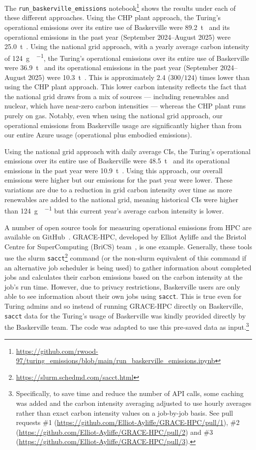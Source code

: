 \documentclass[12pt]{article}
\newcommand{\cooe}{\ensuremath{\mathrm{CO}_2\mathrm{e}}}
\newcommand{\tcooe}[1]{\qty[qualifier-mode=combine]{#1}{\tonne\of{\cooe}}}
\newcommand{\gcookwh}[1]{\qty[qualifier-mode=combine, per-mode=symbol]{#1}{\gram\of{\cooe}\per\KWH}}
\begin{document}
The \texttt{run\_baskerville\_emissions} notebook\footnote{\url{https://github.com/rwood-97/turing_emissions/blob/main/run_baskerville_emissions.ipynb}} shows the results under each of these different approaches.
Using the CHP plant approach, the Turing's operational emissions over its entire use of Baskerville were \qty[qualifier-mode=combine]{89.2}{\tonne\of{\cooe}} and its operational emissions in the past year (September 2024--August 2025) were \tcooe{25.0}. 
Using the national grid approach, with a yearly average carbon intensity of \gcookwh{124}, the Turing's operational emissions over its entire use of Baskerville were \tcooe{36.9} and its operational emissions in the past year (September 2024--August 2025) were \tcooe{10.3}. This is approximately \num{2.4} ($300/124$) times lower than using the CHP plant approach. This lower carbon intensity reflects the fact that the national grid draws from a mix of sources — including renewables and nuclear, which have near-zero carbon intensities — whereas the CHP plant runs purely on gas. 
Notably, even when using the national grid approach, our operational emissions from Baskerville usage are significantly higher than from our entire Azure usage (operational plus embodied emissions).

Using the national grid approach with daily average CIs, the Turing's operational emissions over its entire use of Baskerville were \tcooe{48.5} and its operational emissions in the past year were \tcooe{10.9}.
Using this approach, our overall emissions were higher but our emissions for the past year were lower.
These variations are due to a reduction in grid carbon intensity over time as more renewables are added to the national grid, meaning historical CIs were higher than \gcookwh{124} but this current year's average carbon intensity is lower.

A number of open source tools for measuring operational emissions from HPC are available on GitHub~\cite{greenalgorithms4hpc, grace_hpc}. {GRACE-HPC}, developed by Elliot Ayliffe and the Bristol Centre for SuperComputing (BriCS) team~\cite{grace_hpc}, is one example.
Generally, these tools use the slurm \texttt{sacct}\footnote{\url{https://slurm.schedmd.com/sacct.html}} command (or the non-slurm equivalent of this command if an alternative job scheduler is being used) to gather information about completed jobs and calculates their carbon emissions based on the carbon intensity at the job's run time. 
However, due to privacy restrictions, Baskerville users are only able to see information about their own jobs using \texttt{sacct}. 
This is true even for Turing admins and so instead of running GRACE-HPC directly on Baskerville, \texttt{sacct} data for the Turing's usage of Baskerville was kindly provided directly by the Baskerville team. 
The code was adapted to use this pre-saved data as input.\footnote{Specifically, to save time and reduce the number of API calls, some caching was added and the carbon intensity averaging adjusted to use hourly averages rather than exact carbon intensity values on a job-by-job basis. See pull requests \#1 (\url{https://github.com/Elliot-Ayliffe/GRACE-HPC/pull/1}), \#2 (\url{https://github.com/Elliot-Ayliffe/GRACE-HPC/pull/2}) and \#3 (\url{https://github.com/Elliot-Ayliffe/GRACE-HPC/pull/3}).}
\end{document}
